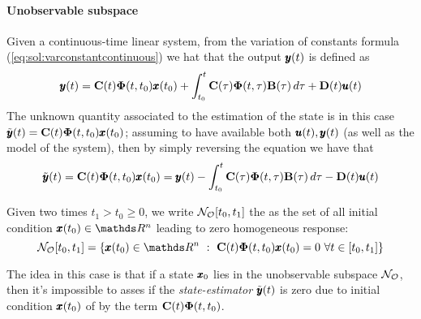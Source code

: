 	\paragraph{Unobservable subspace} Given a continuous-time linear system, from the variation of constants formula (\ref{eq:sol:varconstantcontinuous}) we hat that the output $\pmb{y}(t)$ is defined as
	\[ \pmb{y}(t) = \mathbf{C}(t)\mathbf{\Phi}(t,t_0)\pmb{x}(t_0) + \int_{t_0}^t \mathbf{C}(\tau)\mathbf{\Phi}(t,\tau)\mathbf{B}(\tau)\, d\tau + \mathbf{D}(t)\pmb{u}(t) \]
	The unknown quantity associated to the estimation of the state is in this case $\tilde{\pmb{y}}(t) = \mathbf{C}(t)\mathbf{\Phi}(t,t_0) \pmb{x}(t_0)$; assuming to have available both $\pmb{u}(t),\pmb{y}(t)$ (as well as the model of the system), then by simply reversing the equation we have that
	\begin{equation} \label{eq:obs:temp1}
		\tilde {\pmb{y}}(t) = \mathbf{C}(t)\mathbf{\Phi}(t,t_0)\pmb{x}(t_0) = \pmb{y}(t) - \int_{t_0}^t \mathbf{C}(\tau)\mathbf{\Phi}(t,\tau)\mathbf{B}(\tau)\, d\tau - \mathbf{D}(t)\pmb{u}(t)
	\end{equation}
	\begin{theorem} \label{th:obs:temp1}
		Given two times $t_1>t_0\geq 0$, we write $\mathcal{N_O}[t_0,t_1]$ the  as the set of all initial condition $\x(t_0)\in \mathds R^n$ leading to zero homogeneous response:
		\begin{equation} \label{eq:obs:unobservable}
			\unobs[t_0,t_1] = \left\{ \x(t_0)\in \mathds R^n \ : \ \C(t)\stm(t,t_0)\x(t_0) = 0 \ \forall t\in [t_0,t_1] \right\}
		\end{equation} 
	\end{theorem}
	The idea in this case is that if a state $\pmb{x}_0$ lies in the unobservable subspace $\mathcal{N_O}$, then it's impossible to asses if the \textit{state-estimator} $\tilde {\pmb{y}}(t)$ is zero due to initial condition $\pmb{x}(t_0)$ of by the term $\mathbf{C}(t)\mathbf{\Phi}(t,t_0)$.
	
